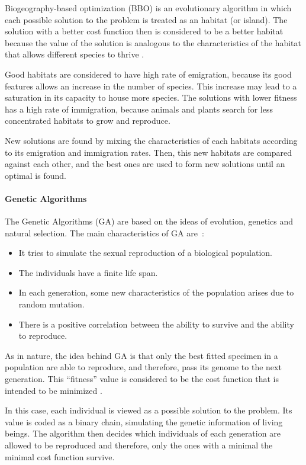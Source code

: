 Biogeography-based optimization (BBO) is an evolutionary algorithm in which each possible solution to the problem is treated as an habitat (or island). The solution with a better cost function then is considered to be a better habitat  because the value of the solution is analogous to the characteristics of the habitat that allows different species to thrive \citep{Simon2008}.

Good habitats are considered to have high rate of emigration, because its good features allows an increase in the number of species. This increase may lead to a saturation in its capacity to house more species. The solutions with lower fitness has a high rate of immigration, because animals and plants search for less concentrated habitats to grow and reproduce.

New solutions are found by mixing the characteristics of each habitats according to its emigration and immigration rates. Then, this new habitats are compared against each other, and the best ones are used to form new solutions until an optimal is found.

\paragraph{Genetic Algorithms}
The Genetic Algorithms (GA) are based on the ideas of evolution, genetics and natural selection. The main characteristics of GA are~\citep{Simon2013}:
%
\begin{itemize}
	\item It tries to simulate the sexual reproduction of a biological population.
	\item The individuals have a finite life span.
	\item In each generation, some new characteristics of the population arises due to random mutation.
	\item There is a positive correlation between the ability to survive and the ability to reproduce.
\end{itemize}

As in nature, the idea behind GA is that only the best fitted specimen in a population are able to reproduce, and therefore, pass its genome to the next generation. This ``fitness'' value is considered to be the cost function that is intended to be minimized \citep{Mitchell1995}.

In this case, each individual is viewed as a possible solution to the problem. Its value is coded as a binary chain, simulating the genetic information of living beings. The algorithm then decides which individuals of each generation are allowed to be reproduced and therefore, only the ones with a minimal the minimal cost function survive.
%

